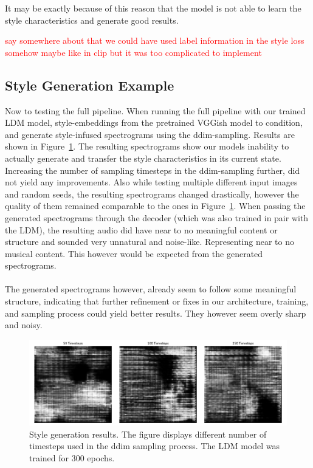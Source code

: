 \noindent It may be exactly because of this reason that the model is not able to learn the style characteristics and generate good results.

\textcolor{red}{say somewhere about that we could have used label information in the style loss somehow maybe like in clip but it was too complicated to implement}

\subsection{Style Generation Example}
Now to testing the full pipeline.
When running the full pipeline with our trained LDM model, style-embeddings from the pretrained VGGish model to condition, and generate 
style-infused spectrograms using the ddim-sampling. Results are shown in Figure~\ref{fig:style_generation_results}. 
The resulting spectrograms show our models inability to actually generate and transfer the style characteristics in its current state.
Increasing the number of sampling timesteps in the ddim-sampling further, did not yield any improvements.
Also while testing multiple different input images and random seeds, the resulting spectrograms changed drastically, 
however the quality of them remained comparable to the ones in Figure~\ref{fig:style_generation_results}.
When passing the generated spectrograms through the decoder (which was also trained in pair with the LDM), 
the resulting audio did have near to no meaningful content or structure and sounded very unnatural and noise-like.
Representing near to no musical content. This however would be expected from the generated spectrograms.
\\\\
The generated spectrograms however, already seem to follow some meaningful structure, indicating that further refinement or fixes in our 
architecture, training, and sampling  process could yield better results. They however seem overly sharp and noisy.

\begin{figure}[h]
    \centering
    \includegraphics[width=\textwidth]{figures/test_ddimgen_ldm300epochs_generated_mel_spectrograms_comparison.png}
    \caption{Style generation results. The figure displays different number of timesteps used in the ddim sampling process. 
    The LDM model was trained for 300 epochs.}
    \label{fig:style_generation_results}
\end{figure}


